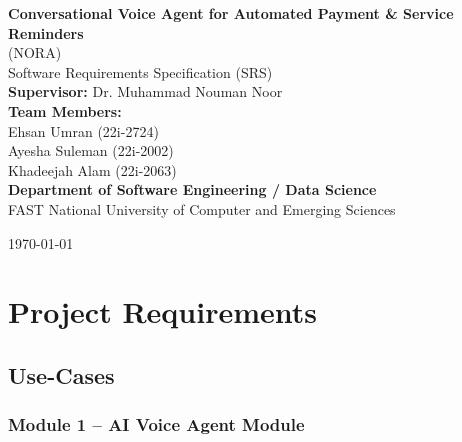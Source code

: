 \documentclass[12pt,a4paper]{report}
\begin{document}

\begin{titlepage}
\centering

\vspace*{1cm}

{\Huge \textbf{Conversational Voice Agent for Automated Payment \& Service Reminders}} \\[0.5cm]

{\Large (NORA)} \\[1cm]

{\Large Software Requirements Specification (SRS)} \\[1.5cm]

\textbf{Supervisor:} Dr. Muhammad Nouman Noor \\[0.3cm]

\textbf{Team Members:} \\[0.2cm]
Ehsan Umran (22i-2724) \\
Ayesha Suleman (22i-2002) \\
Khadeejah Alam (22i-2063) \\[1cm]

\textbf{Department of Software Engineering / Data Science} \\
FAST National University of Computer and Emerging Sciences \\[1cm]

\vfill

{\large \today}

\end{titlepage}







\chapter{Project Requirements}


\section{Use-Cases}

\subsection{Module 1 – AI Voice Agent Module}
\end{document}

